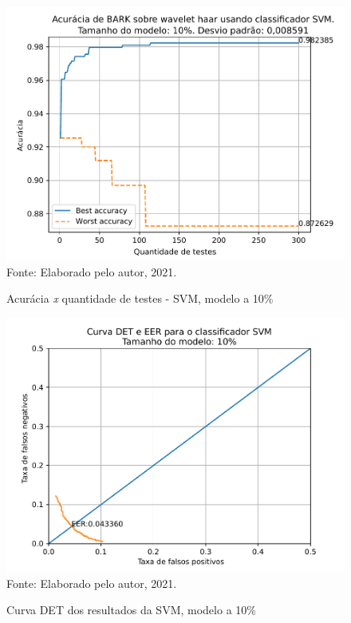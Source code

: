			\begin{figure}[H]
				\centering
				\caption{Acurácia \textit{x} quantidade de testes - SVM, modelo a 10\%}
				\includegraphics[width=.9\linewidth]{images/results/confusionMatrices/classifier_SVM_10}
				\label{fig:classifiersvm10}
				\\Fonte: Elaborado pelo autor, 2021.
			\end{figure}
		
			\begin{figure}[H]
				\centering
				\caption{Curva DET dos resultados da SVM, modelo a 10\%}
				\includegraphics[width=.9\linewidth]{images/results/det/DET_for_classifier_SVM_10}
				\label{fig:detsvm10}
				\\Fonte: Elaborado pelo autor, 2021.
			\end{figure}

